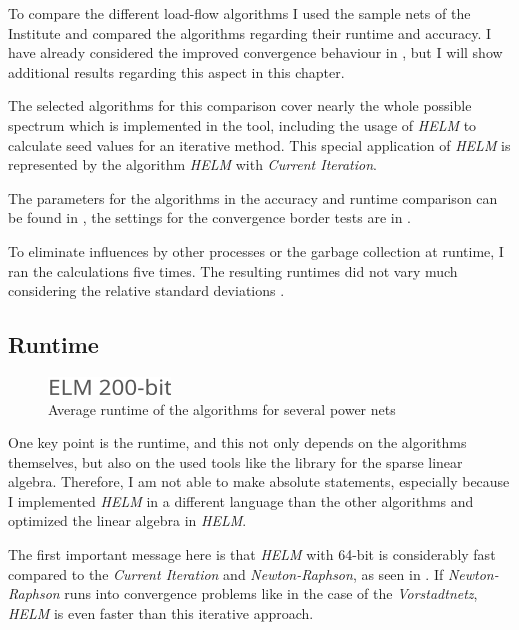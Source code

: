 To compare the different load-flow algorithms I used the sample nets of the Institute and compared the algorithms regarding their runtime and accuracy. I have already considered the improved convergence behaviour in , but I will show additional results regarding this aspect in this chapter.

The selected algorithms for this comparison cover nearly the whole possible spectrum which is implemented in the tool, including the usage of \emph{HELM} to calculate seed values for an iterative method. This special application of \emph{HELM} is represented by the algorithm \emph{HELM} with \emph{Current Iteration}.

The parameters for the algorithms in the accuracy and runtime comparison can be found in , the settings for the convergence border tests are in .

To eliminate influences by other processes or the garbage collection at runtime, I ran the calculations five times. The resulting runtimes did not vary much considering the relative standard deviations .

\subsection{Runtime}

\begin{figure}
	\centering
	\includegraphics[scale=0.7]{figures/comparison_runtime}
	\caption[Comparison, average runtime]{Average runtime of the algorithms for several power nets}
	\label{fig:comparison_runtime}
\end{figure}

One key point is the runtime, and this not only depends on the algorithms themselves, but also on the used tools like the library for the sparse linear algebra. Therefore, I am not able to make absolute statements, especially because I implemented \emph{HELM} in a different language than the other algorithms and optimized the linear algebra in \emph{HELM}.

The first important message here is that \emph{HELM} with 64-bit is considerably fast compared to the \emph{Current Iteration} and \emph{Newton-Raphson}, as seen in . If \emph{Newton-Raphson} runs into convergence problems like in the case of the \emph{Vorstadtnetz}, \emph{HELM} is even faster than this iterative approach. 

